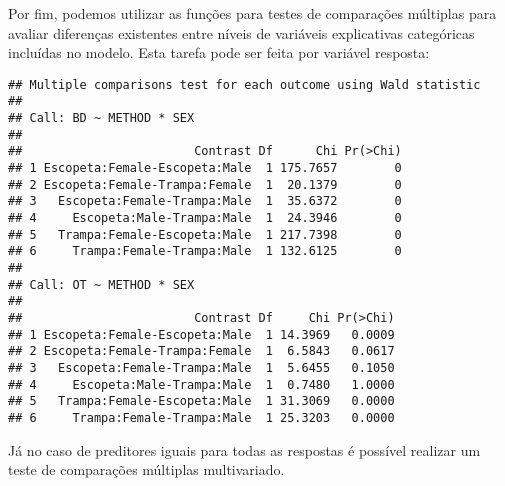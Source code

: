 Por fim, podemos utilizar as funções para testes de comparações múltiplas para avaliar diferenças existentes entre níveis de variáveis explicativas categóricas incluídas no modelo. Esta tarefa pode ser feita por variável resposta:

\begin{knitrout}
\color{fgcolor}\begin{kframe}
\begin{alltt}
\hlstd{(} 
             \hlstd{=} \hlstd{(}\hlstd{(}\hlstd{,} \hlstd{),}
                          \hlstd{(}\hlstd{,} \hlstd{)),}
             
\end{alltt}
\begin{verbatim}
## Multiple comparisons test for each outcome using Wald statistic
## 
## Call: BD ~ METHOD * SEX
## 
##                        Contrast Df      Chi Pr(>Chi)
## 1 Escopeta:Female-Escopeta:Male  1 175.7657        0
## 2 Escopeta:Female-Trampa:Female  1  20.1379        0
## 3   Escopeta:Female-Trampa:Male  1  35.6372        0
## 4     Escopeta:Male-Trampa:Male  1  24.3946        0
## 5   Trampa:Female-Escopeta:Male  1 217.7398        0
## 6     Trampa:Female-Trampa:Male  1 132.6125        0
## 
## Call: OT ~ METHOD * SEX
## 
##                        Contrast Df     Chi Pr(>Chi)
## 1 Escopeta:Female-Escopeta:Male  1 14.3969   0.0009
## 2 Escopeta:Female-Trampa:Female  1  6.5843   0.0617
## 3   Escopeta:Female-Trampa:Male  1  5.6455   0.1050
## 4     Escopeta:Male-Trampa:Male  1  0.7480   1.0000
## 5   Trampa:Female-Escopeta:Male  1 31.3069   0.0000
## 6     Trampa:Female-Trampa:Male  1 25.3203   0.0000
\end{verbatim}
\end{kframe}
\end{knitrout}

Já no caso de preditores iguais para todas as respostas é possível realizar um teste de comparações múltiplas multivariado.

